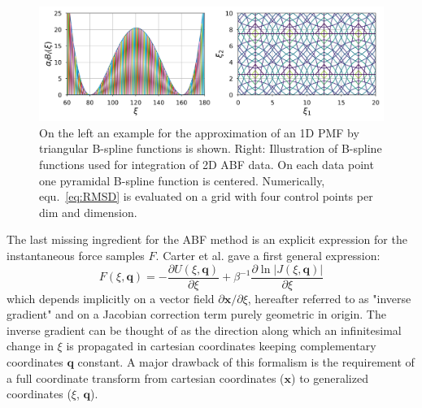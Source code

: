 \begin{figure}[H]
    \centering
    \includegraphics[width=1\textwidth]{bilder/FEM}
    \caption{
      On the left an example for the approximation of an 1D PMF by triangular B-spline functions is shown.
      Right: Illustration of B-spline functions used for integration of 2D ABF data. On each data point one pyramidal B-spline function is centered. Numerically, equ.~\ref{eq:RMSD} is evaluated on a grid with four control points per dim and dimension.
    }
\label{fig:FEM}%
\end{figure}
The last missing ingredient for the ABF method is an explicit expression for the instantaneous force samples $F$. Carter et al.\autocite{carter1989constrained} gave a first general expression:
\begin{equation}
  F(\xi,\textbf{q}) = -\frac{\partial U(\xi,\textbf{q})}{\partial \xi} + \beta^{-1} \frac{\partial \ln|J(\xi,\textbf{q})|}{\partial\xi} \label{eq:instforce old}
\end{equation}
which depends implicitly on a vector field $\partial \textbf{x} / \partial \xi$, hereafter referred to as "inverse gradient" and on a Jacobian correction term purely geometric in origin. The inverse gradient can be thought of as the direction along which an infinitesimal change in $\xi$ is propagated in cartesian coordinates keeping complementary coordinates $\textbf{q}$ constant. A major drawback of this formalism is the requirement of a full coordinate transform from cartesian coordinates ($\textbf{x}$) to generalized coordinates ($\xi$, $\textbf{q}$).

